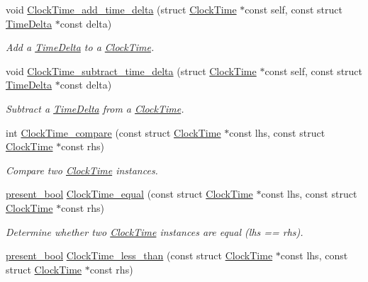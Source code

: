 \begin{DoxyCompactItemize}
void \hyperlink{clock-time_8h_adc2c863dfec0b56604b3153b226139fb}{\-Clock\-Time\-\_\-add\-\_\-time\-\_\-delta} (struct \hyperlink{structClockTime}{\-Clock\-Time} $\ast$const self, const struct \hyperlink{structTimeDelta}{\-Time\-Delta} $\ast$const delta)
\begin{DoxyCompactList}\small\item\em \-Add a \hyperlink{structTimeDelta}{\-Time\-Delta} to a \hyperlink{structClockTime}{\-Clock\-Time}. \end{DoxyCompactList}\item 
void \hyperlink{clock-time_8h_a5305df919aa0992ba4703f9b9f292a67}{\-Clock\-Time\-\_\-subtract\-\_\-time\-\_\-delta} (struct \hyperlink{structClockTime}{\-Clock\-Time} $\ast$const self, const struct \hyperlink{structTimeDelta}{\-Time\-Delta} $\ast$const delta)
\begin{DoxyCompactList}\small\item\em \-Subtract a \hyperlink{structTimeDelta}{\-Time\-Delta} from a \hyperlink{structClockTime}{\-Clock\-Time}. \end{DoxyCompactList}\item 
int \hyperlink{clock-time_8h_a769989ae3695814b6f64b17ff059d76a}{\-Clock\-Time\-\_\-compare} (const struct \hyperlink{structClockTime}{\-Clock\-Time} $\ast$const lhs, const struct \hyperlink{structClockTime}{\-Clock\-Time} $\ast$const rhs)
\begin{DoxyCompactList}\small\item\em \-Compare two \hyperlink{structClockTime}{\-Clock\-Time} instances. \end{DoxyCompactList}\item 
\hyperlink{types_8h_a1c24e2cdd988b886e889080ded176ae0}{present\-\_\-bool} \hyperlink{clock-time_8h_aface5d0e8bf75acddb72475d76c4b1d8}{\-Clock\-Time\-\_\-equal} (const struct \hyperlink{structClockTime}{\-Clock\-Time} $\ast$const lhs, const struct \hyperlink{structClockTime}{\-Clock\-Time} $\ast$const rhs)
\begin{DoxyCompactList}\small\item\em \-Determine whether two \hyperlink{structClockTime}{\-Clock\-Time} instances are equal (lhs == rhs). \end{DoxyCompactList}\item 
\hyperlink{types_8h_a1c24e2cdd988b886e889080ded176ae0}{present\-\_\-bool} \hyperlink{clock-time_8h_ad0b394066f11e1f695bd10c2aad04ea0}{\-Clock\-Time\-\_\-less\-\_\-than} (const struct \hyperlink{structClockTime}{\-Clock\-Time} $\ast$const lhs, const struct \hyperlink{structClockTime}{\-Clock\-Time} $\ast$const rhs)

\end{DoxyCompactItemize}
